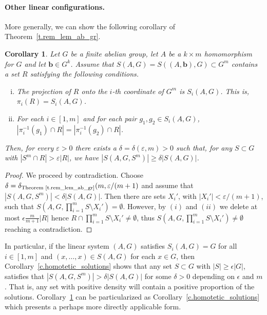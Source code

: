 \documentclass[10pt]{article}
\newtheorem{corollary}[theorem]{Corollary}
\begin{document}
\paragraph{Other linear configurations.}

More generally, we can show the following corollary of Theorem~\ref{t.rem_lem_ab_gr}.

\begin{corollary}\label{c.homotetic_solutions2}
	Let $G$ be a finite abelian group, let $A$ be a $k\times m$ homomorphism for $G$ and let $\mathbf{b}\in G^k$. Assume that $S(A,G)=S((A,\mathbf{b}),G)\subset G^m$ contains a set $R$ satisfying the following conditions.
	\begin{enumerate}[(i)]
	\item The projection of $R$ onto the $i$-th coordinate of $G^m$  is $S_i(A,G)$. This is, $\pi_i(R)=S_i(A,G)$.
	\item For each $i\in[1,m]$ and for each pair $g_1,g_2\in S_i(A,G)$,
	$|\pi_i^{-1}(g_1)\cap R|=|\pi_i^{-1}(g_2)\cap R|$.
\end{enumerate}
 Then, for every $\varepsilon>0$ there exists a $\delta=\delta(\varepsilon,m)>0$ such that, for any $S\subset G$ with $|S^m\cap R|>\varepsilon |R|$, we have $\left|S(A,G,S^m)\right|\geq\delta \left|S(A,G)\right|$.
\end{corollary}

\begin{proof}
	We proceed by contradiction.
Choose $\delta=\delta_{\text{Theorem~\ref{t.rem_lem_ab_gr}}}(m,\varepsilon/(m+1)$ and assume that $\left|S(A,G,S^m)\right|<\delta \left|S(A,G)\right|$. Then there are sets $X_i'$, with $|X_i'|< \varepsilon/(m+1)$, such that $S(A,G,\prod_{i=1}^m S\setminus X_i')=\emptyset$. However, by $(i)$ and $(ii)$ we delete at most $\epsilon\frac{m}{m+1}|R|$ hence $R\cap \prod_{i=1}^m S\setminus X_i'\neq \emptyset$, thus $S(A,G,\prod_{i=1}^m S\setminus X_i')\neq \emptyset$ reaching a contradiction.
\end{proof}

In particular, if the linear system $(A,G)$ satisfies $S_i(A,G)=G$ for all $i\in[1,m]$ and $(x,\ldots,x)\in S(A,G)$ for each $x\in G$, then Corollary~\ref{c.homotetic_solutions} shows that any set $S\subset G$ with $|S|\geq \epsilon |G|$, satisfies that $|S(A,G,S^m)|>\delta |S(A,G)|$ for some $\delta>0$ depending on $\epsilon$ and $m$. That is, any set with positive density will contain a positive proportion of the solutions.
Corollary~\ref{c.homotetic_solutions2} can be particularized as
Corollary~\ref{c.homotetic_solutions} which presents a perhaps more directly applicable form.
\end{document}
